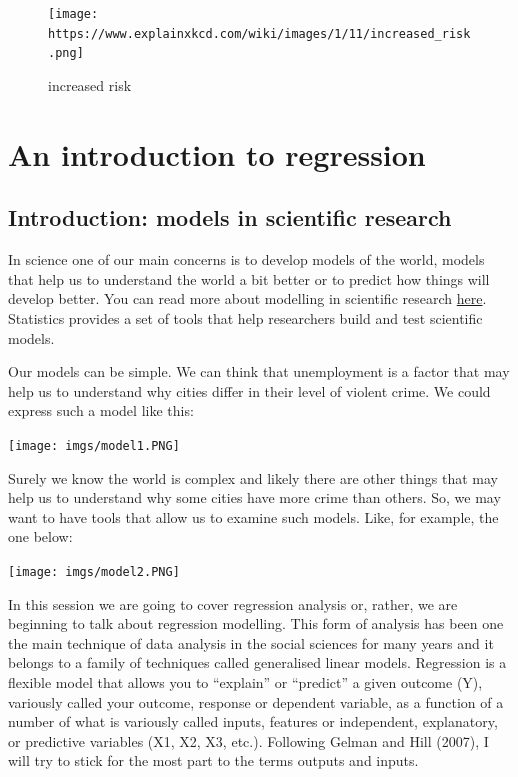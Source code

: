 \documentclass[
]{book}
\begin{document}
\begin{figure}
\centering
\texttt{[image: https://www.explainxkcd.com/wiki/images/1/11/increased\_risk.png]}
\caption{increased risk}
\end{figure}

\hypertarget{an-introduction-to-regression}{%
\chapter{An introduction to regression}\label{an-introduction-to-regression}}

\hypertarget{introduction-models-in-scientific-research}{%
\section{Introduction: models in scientific research}\label{introduction-models-in-scientific-research}}

In science one of our main concerns is to develop models of the world, models that help us to understand the world a bit better or to predict how things will develop better. You can read more about modelling in scientific research \href{https://www.visionlearning.com/en/library/Process-of-Science/49/Modeling-in-Scientific-Research/153}{here}. Statistics provides a set of tools that help researchers build and test scientific models.

Our models can be simple. We can think that unemployment is a factor that may help us to understand why cities differ in their level of violent crime. We could express such a model like this:

\texttt{[image: imgs/model1.PNG]}

Surely we know the world is complex and likely there are other things that may help us to understand why some cities have more crime than others. So, we may want to have tools that allow us to examine such models. Like, for example, the one below:

\texttt{[image: imgs/model2.PNG]}

In this session we are going to cover regression analysis or, rather, we are beginning to talk about regression modelling. This form of analysis has been one the main technique of data analysis in the social sciences for many years and it belongs to a family of techniques called generalised linear models. Regression is a flexible model that allows you to ``explain'' or ``predict'' a given outcome (Y), variously called your outcome, response or dependent variable, as a function of a number of what is variously called inputs, features or independent, explanatory, or predictive variables (X1, X2, X3, etc.). Following Gelman and Hill (2007), I will try to stick for the most part to the terms outputs and inputs.
\end{document}
